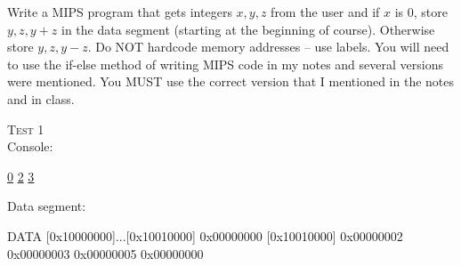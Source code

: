 

\renewcommand\AUTHOR{aoro1@cougars.ccis.edu} %


\topmattertwo

\nextq
Write a MIPS program that gets integers $x, y, z$ 
from the user and if $x$ is 0, 
store $y, z, y + z$ in the data segment 
(starting at the beginning of course). 
Otherwise store $y, z, y - z$.
Do NOT hardcode memory addresses -- use labels.
You will need to use the if-else method of writing MIPS code in my notes
and several versions were mentioned.
You MUST use the correct version that I mentioned in the notes and in class.

\textsc{Test 1} \\
Console:
\begin{console}[fontsize=\footnotesize,commandchars=\\\{\}]
\underline{0}
\underline{2}
\underline{3}
\end{console}
Data segment:
\begin{console}[fontsize=\footnotesize]
	DATA
[0x10000000]...[0x10010000]  0x00000000
[0x10010000]                 0x00000002 0x00000003 0x00000005 0x00000000
\end{console}
 
